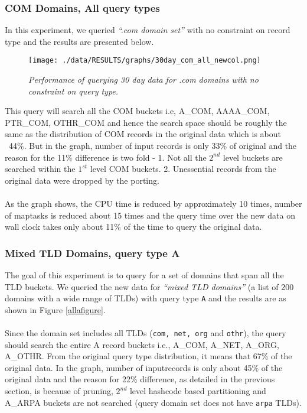 \documentclass[11pt,a4paper]{article}
\begin{document}
\subsubsection{COM Domains, All query types}
In this experiment, we queried \textit{``.com domain set''} with no constraint on record type and the results are presented below.

\begin{figure}[H] 
\centering
\texttt{[image: ./data/RESULTS/graphs/30day\_com\_all\_newcol.png]}
\caption {\textit{Performance of querying 30 day data for .com domains with no constraint on query type.}}
\end{figure}

\noindent
This query will search all the COM buckets i.e, A\_COM, AAAA\_COM, PTR\_COM, OTHR\_COM and hence the search space should be roughly the same as the distribution of COM records in the original data which is about ~44\%. But in the graph, number of input records is only 33\% of original and the reason for the 11\% difference is two fold - 1. Not all the $2^{nd}$ level buckets are searched within the $1^{st}$ level COM buckets. 2. Unessential records from the original data were dropped by the porting.
\\\\
As the graph shows, the CPU time is reduced by approximately 10 times, number of maptasks is reduced about 15 times and the query time over the new data on wall clock takes only about 11\% of the time to query the original data.

\subsubsection{Mixed TLD Domains, query type A}
The goal of this experiment is to query for a set of domains that span all the TLD buckets. We queried the new data for \textit{``mixed TLD domains''} (a list of 200 domains with a wide range of TLDs) with query type \texttt{A} and the results are as shown in Figure \ref{allafigure}.
\\\\
Since the domain set includes all TLDs (\texttt{com, net, org} and \texttt{othr}), the query should search the entire A record buckets i.e., A\_COM, A\_NET, A\_ORG, A\_OTHR. From the original query type distribution, it means that 67\% of the original data. In the graph, number of inputrecords is only about 45\% of the original data and the reason for 22\% difference, as detailed in the previous section, is because of pruning, $2^{nd}$ level hashcode based partitioning and A\_ARPA buckets are not searched (query domain set does not have \texttt{arpa} TLDs).  
\end{document}
